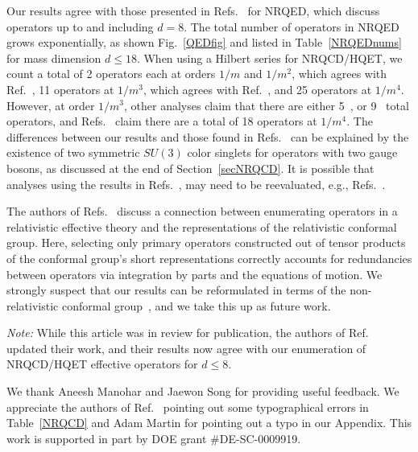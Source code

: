\documentclass[prd,onecolumn, nofootinbib, 11pt]{revtex4}
\begin{document}
Our results agree with those presented in Refs.~\cite{Caswell:1985ui, Kinoshita:1995mt, Manohar:1997qy, Hill:2012rh} for NRQED, which discuss operators up to and including $d=8$.  
The total number of operators in NRQED grows exponentially, as shown Fig.~\ref{QEDfig} and listed in Table~\ref{NRQEDnums} for mass dimension $d\leq 18$. 
%
When using a Hilbert series for NRQCD/HQET, we count a total of 2 operators each at orders $1/m$ and $1/m^2$, which agrees with Ref.~\cite{Mannel:1994kv}, 11 operators at $1/m^3$, which agrees with Ref.~\cite{Manohar:1997qy}, and 25 operators at $1/m^4$.  
%
However, at order $1/m^3$, other analyses claim that there are either 5~\cite{Dassinger:2006md}, or 9~\cite{Mannel:2010wj, Gunawardana:2017zix} total operators, and Refs.~\cite{Mannel:2010wj, Gunawardana:2017zix} claim there are a total of 18 operators at $1/m^4$.   
%
The differences between our results and those found in Refs.~\cite{Mannel:2010wj, Gunawardana:2017zix} can be explained by the existence of two symmetric $SU(3)$ color singlets for operators with two gauge bosons, as discussed at the end of Section~\ref{secNRQCD}.  It is possible that analyses using the results in Refs.~\cite{Dassinger:2006md, Mannel:2010wj, Gunawardana:2017zix}, may need to be reevaluated, e.g., Refs.~\cite{Gambino:2016jkc, Heinonen:2016cwm, Heinonen:2014dxa}. 

The authors of Refs.~\cite{Henning:2015daa, Henning:2015alf} discuss a connection between enumerating operators in a relativistic effective theory and the representations of the relativistic conformal group.  Here,  selecting only primary operators constructed out of tensor products of the conformal group's short representations correctly accounts for redundancies between operators via integration by parts and the equations of motion. 
%
We strongly suspect that our results can be reformulated in terms of the non-relativistic conformal group~\cite{Balasubramanian:2008dm, Goldberger:2014hca, Nishida:2007pj, Jensen:2014hqa, Pal:2017ntk}, and we take this up as future work.

{\it Note:} While this article was in review for publication, the authors of Ref.~\cite{Gunawardana:2017zix} updated their work, and their results now agree with our enumeration of NRQCD/HQET effective operators for $d\leq 8$. 


\begin{acknowledgments}
We thank Aneesh Manohar and Jaewon Song for providing useful feedback.  We appreciate the authors of Ref.~\cite{Gunawardana:2017zix} pointing out some typographical errors in Table~\ref{NRQCD} and Adam Martin for pointing out a typo in our Appendix.  This work is supported in part by DOE grant \#DE-SC-0009919.
\end{acknowledgments}
\end{document}
